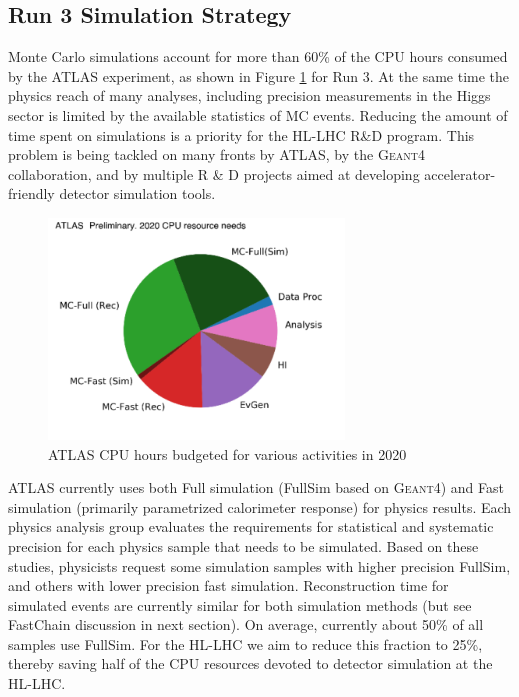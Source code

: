 \subsection{Run 3 Simulation Strategy}
Monte Carlo simulations account for more than 60\% of the CPU hours consumed by the ATLAS experiment, as shown in Figure \ref{fig:Run3CPUbyActivity} for Run 3. At the same time the physics reach of many analyses, including precision measurements in the Higgs sector is limited by the available statistics of MC events. Reducing the amount of time spent on simulations is a priority  for the HL-LHC R\&D program. This problem is being tackled on many fronts by ATLAS, by the G\textsc{eant}4 collaboration, and by multiple R \& D projects aimed at developing accelerator-friendly detector simulation tools.

\begin{figure}
    \centering
    \includegraphics[width=0.70\textwidth]{figures/ATLASpreliminary2020CPUResourceNeeds.png}
    \caption{ATLAS CPU hours budgeted for various activities in 2020}
    \label{fig:Run3CPUbyActivity}
\end{figure}


ATLAS currently uses both Full simulation (FullSim based on G\textsc{eant}4) and Fast simulation (primarily parametrized calorimeter response) for physics results. Each physics analysis group evaluates the requirements for statistical and systematic precision for each physics sample that needs to be simulated. Based on these studies, physicists request some simulation samples with higher precision FullSim, and others with lower precision fast simulation. Reconstruction time for simulated events are currently similar for both simulation methods (but see FastChain discussion in next section). On average, currently about 50\% of all samples use FullSim. For the HL-LHC we aim to reduce this fraction to 25\%, thereby saving half of the CPU resources devoted to detector simulation at the HL-LHC. 

